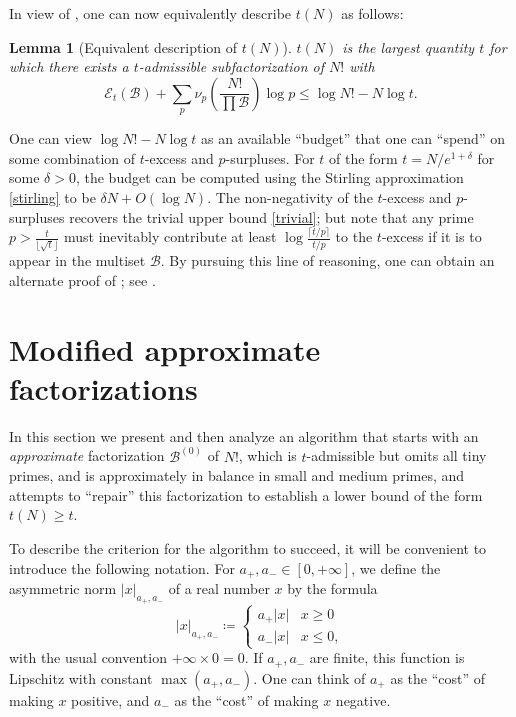 \documentclass[10pt,a4paper,reqno]{amsart}
\numberwithin{equation}{section}
\theoremstyle{plain}
\newtheorem{lemma}[theorem]{Lemma}
\theoremstyle{definition}
\newcommand\tuple{{\mathcal B}}
\newcommand\excess{{\mathcal{E}}}
\begin{document}
In view of , one can now equivalently describe 
$t(N)$ as follows:

\begin{lemma}[Equivalent description of $t(N)$]\label{t-descrip}  $t(N)$ is the largest quantity $t$ for which there exists a $t$-admissible subfactorization of $N!$ with
$$ \excess_t(\tuple) + \sum_p \nu_p\left( \frac{N!}{\prod \tuple} \right) \log p \leq \log N! - N \log t.$$
\end{lemma}

One can view $\log N! - N\log t$ as an available ``budget'' that one can ``spend'' on some combination of $t$-excess and $p$-surpluses.  For $t$ of the form $t = N/e^{1+\delta}$ for some $\delta>0$, the budget can be computed using the Stirling approximation \eqref{stirling} to be $\delta N + O(\log N)$.  The non-negativity of the $t$-excess and $p$-surpluses recovers the trivial upper bound \eqref{trivial}; but note that any prime $p > \frac{t}{\lfloor \sqrt{t} \rfloor}$ must inevitably contribute at least $\log \frac{\lceil t/p\rceil}{t/p}$ to the $t$-excess if it is to appear in the multiset $\tuple$.  By pursuing this line of reasoning, one can obtain an alternate proof of ; see \cite[Lemma 2.1]{tao}.

\section{Modified approximate factorizations}\label{approx-sec}

In this section we present and then analyze an algorithm that starts with an \emph{approximate} factorization $\tuple^{(0)}$ of $N!$, which is $t$-admissible but omits all tiny primes, and is approximately in balance in small and medium primes, and attempts to ``repair'' this factorization to establish a lower bound of the form $t(N) \geq t$.  

To describe the criterion for the algorithm to succeed, it will be convenient to introduce the following notation.
For $a_+,a_- \in [0,+\infty]$, we define the asymmetric norm $|x|_{a_+,a_-}$ of a real number $x$ by the formula
$$ 
|x|_{a_+,a_-} \coloneqq  \begin{cases} 
  a_+ |x| & x\geq 0 \\
  a_- |x| & x\leq 0,
\end{cases}
$$
with the usual convention $+\infty \times 0 = 0$.
If $a_+,a_-$ are finite, this function is Lipschitz with constant $\max(a_+,a_-)$.  One can think of $a_+$ as the ``cost'' of making $x$ positive, and $a_-$ as the
``cost'' of making $x$ negative. 
\end{document}
